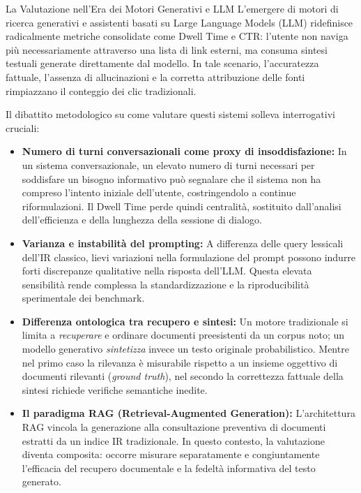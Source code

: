 \begin{alertblock}{La Valutazione nell'Era dei Motori Generativi e LLM}
L'emergere di motori di ricerca generativi e assistenti basati su Large Language Models (LLM) ridefinisce radicalmente metriche consolidate come Dwell Time e CTR: l'utente non naviga pi\`u necessariamente attraverso una lista di link esterni, ma consuma sintesi testuali generate direttamente dal modello. In tale scenario, l'accuratezza fattuale, l'assenza di allucinazioni e la corretta attribuzione delle fonti rimpiazzano il conteggio dei clic tradizionali.

Il dibattito metodologico su come valutare questi sistemi solleva interrogativi cruciali:
\begin{itemize}
    \item \textbf{Numero di turni conversazionali come proxy di insoddisfazione:} In un sistema conversazionale, un elevato numero di turni necessari per soddisfare un bisogno informativo pu\`o segnalare che il sistema non ha compreso l'intento iniziale dell'utente, costringendolo a continue riformulazioni. Il Dwell Time perde quindi centralit\`a, sostituito dall'analisi dell'efficienza e della lunghezza della sessione di dialogo.
    \item \textbf{Varianza e instabilit\`a del prompting:} A differenza delle query lessicali dell'IR classico, lievi variazioni nella formulazione del prompt possono indurre forti discrepanze qualitative nella risposta dell'LLM. Questa elevata sensibilit\`a rende complessa la standardizzazione e la riproducibilit\`a sperimentale dei benchmark.
    \item \textbf{Differenza ontologica tra recupero e sintesi:} Un motore tradizionale si limita a \textit{recuperare} e ordinare documenti preesistenti da un corpus noto; un modello generativo \textit{sintetizza} invece un testo originale probabilistico. Mentre nel primo caso la rilevanza \`e misurabile rispetto a un insieme oggettivo di documenti rilevanti (\textit{ground truth}), nel secondo la correttezza fattuale della sintesi richiede verifiche semantiche inedite.
    \item \textbf{Il paradigma RAG (Retrieval-Augmented Generation):} L'architettura RAG vincola la generazione alla consultazione preventiva di documenti estratti da un indice IR tradizionale. In questo contesto, la valutazione diventa composita: occorre misurare separatamente e congiuntamente l'efficacia del recupero documentale e la fedelt\`a informativa del testo generato.
\end{itemize}
\end{alertblock}

